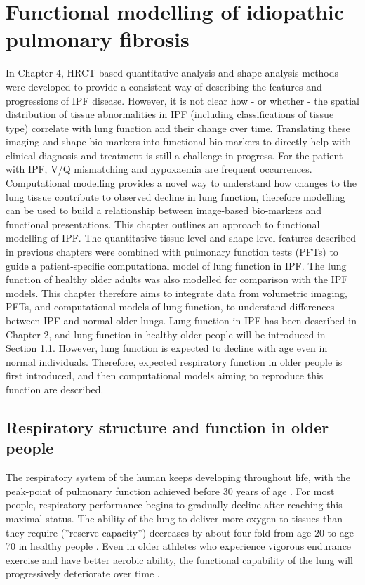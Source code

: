 \chapter{Functional modelling of idiopathic pulmonary fibrosis}\label{Yuwen_ModelBasedAnalysis}
In Chapter 4, HRCT based quantitative analysis and shape analysis methods were developed to provide a consistent way of describing the features and progressions of IPF disease. However, it is not clear how - or whether - the spatial distribution of tissue abnormalities in IPF (including classifications of tissue type) correlate with lung function and their change over time. Translating these imaging and shape bio-markers into functional bio-markers to directly help with clinical diagnosis and treatment is still a challenge in progress. For the patient with IPF, V/Q mismatching and hypoxaemia are frequent occurrences. Computational modelling provides a novel way to understand how changes to the lung tissue contribute to observed decline in lung function, therefore modelling can be used to build a relationship between image-based bio-markers and functional presentations. This chapter outlines an approach to functional modelling of IPF. The quantitative tissue-level and shape-level features described in previous chapters were combined with pulmonary function tests (PFTs) to guide a patient-specific computational model of lung function in IPF. The lung function of healthy older adults was also modelled for comparison with the IPF models. This chapter therefore aims to integrate data from volumetric imaging, PFTs, and computational models of lung function, to understand differences between IPF and normal older lungs. Lung function in IPF has been described in Chapter 2, and lung function in healthy older people will be introduced in Section \ref{OlderRespiratory}. However, lung function is expected to decline with age even in normal individuals. Therefore, expected respiratory function in older people is first introduced, and then computational models aiming to reproduce this function are described.

\section{Respiratory structure and function in older people} \label{OlderRespiratory}
The respiratory system of the human keeps developing throughout life, with the peak-point of pulmonary function achieved before 30 years of age \citep{janssens1999physiological,sprung2006age}. For most people, respiratory performance begins to gradually decline after reaching this maximal status. The ability of the lung to deliver more oxygen to tissues than they require (''reserve capacity'') decreases by about four-fold from age 20 to age 70 in healthy people \citep{smith1986respiratory,zaugg2000respiratory}. Even in older athletes who experience vigorous endurance exercise and have better aerobic ability, the functional capability of the lung will progressively deteriorate over time \citep{mittman1965relationship, pollock1997twenty, mcclaran1995longitudinal}. 

